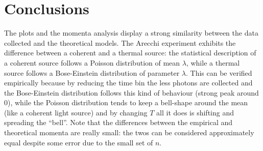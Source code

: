 
\section{Conclusions}
The plots and the momenta analysis display a strong similarity between the data collected and the theoretical models. The Arecchi experiment exhibits the difference between a coherent and a thermal source: the statistical description of a coherent source follows a Poisson distribution of mean $\lambda$, while a thermal source follows a Bose-Einstein distribution of parameter $\lambda$. This can be verified empirically because by reducing the time bin the less photons are collected and the Bose-Einstein distribution follows this kind of behaviour (strong peak around $0$), while the Poisson distribution tends to keep a bell-shape around the mean (like a coherent light source) and by changing $T$ all it does is shifting and spreading the ``bell''. Note that the differences between the empirical and theoretical momenta are really small: the twos can be considered approximately equal despite some error due to the small set of $n$.